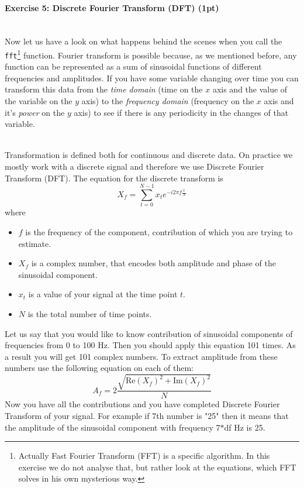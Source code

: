 \documentclass[a4paper,11pt]{article}
\newenvironment{exercise}[3]{\paragraph{Exercise #1: #2 (#3pt)}\ \\}{
\medskip}
\begin{document}
%
%
\begin{exercise}{5}{Discrete Fourier Transform (DFT)}{1}
Now let us have a look on what happens behind the scenes when you call the \texttt{fft}\footnote{Actually Fast Fourier Transform (FFT) is a specific algorithm. In this exercise we do not analyse that, but rather look at the equations, which FFT solves in his own mysterious way.} function. Fourier transform is possible because, as we mentioned before, any function can be represented as a sum of sinusoidal functions of different frequencies and amplitudes. If you have some variable changing over time you can transform this data from the \emph{time domain} (time on the $x$ axis and the value of the variable on the $y$ axis) to the \emph{frequency domain} (frequency on the $x$ axis and it's \emph{power} on the $y$ axis) to see if there is any periodicity in the changes of that variable.

\ \\
Transformation is defined both for continuous and discrete data. On practice we mostly work with a discrete signal and therefore we use Discrete Fourier Transform (DFT). The equation for the discrete transform is
$$X_f = \displaystyle\sum_{t=0}^{N-1}x_t e^{-i2\pi f\frac{t}{N}}$$
where
\begin{itemize}
\itemsep 0em
	\item $f$ is the frequency of the component, contribution of which you are trying to estimate.
	\item $X_f$ is a complex number, that encodes both amplitude and phase of the sinusoidal component.
	\item $x_t$ is a value of your signal at the time point $t$.
	\item $N$ is the total number of time points.
\end{itemize}
Let us say that you would like to know contribution of sinusoidal components of frequencies from 0 to 100 Hz. Then you should apply this equation 101 times. As a result you will get 101 complex numbers.
To extract amplitude from these numbers use the following equation on each of them:
$$A_f = 2\frac{\sqrt{\text{Re}(X_f)^2 + \text{Im}(X_f)^2}}{N}$$
Now you have all the contributions and you have completed Discrete Fourier Transform of your signal. For example if 7th number is "25" then it means that the amplitude of the sinusoidal component with frequency 7$*$df Hz is 25.


\end{exercise}
\end{document}
